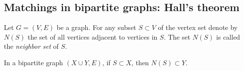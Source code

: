 \begin{page}
\setcounter{section}{4}
\setcounter{subsection}{4}
\setcounter{dfn}{5}
\label{portion:336}

% 




\end{page}

\begin{page}
\setcounter{section}{4}
\setcounter{subsection}{4}
\setcounter{dfn}{5}
\label{portion:337}

\subsection{Matchings in bipartite graphs: Hall's theorem}

\end{page}

\begin{page}
\setcounter{section}{4}
\setcounter{subsection}{4}
\setcounter{dfn}{6}
\label{portion:339}

\begin{dfn}
Let $G = (V, E)$ be a graph.
For any subset $S \subset V$ of the vertex set denote by $N(S)$ the set of all vertices adjacent to vertices in $S$.
The set $N(S)$ is called the \emph{neighbor set} of $S$.
\end{dfn}

\end{page}

\begin{page}
\setcounter{section}{4}
\setcounter{subsection}{4}
\setcounter{dfn}{6}
\label{portion:340}


In a bipartite graph $(X \cup Y, E)$, if $S \subset X$, then $N(S) \subset Y$.



\end{page}

